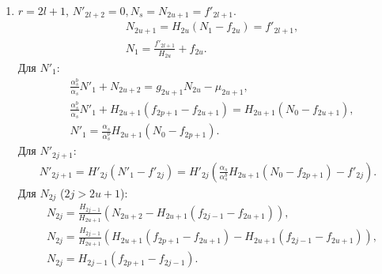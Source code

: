 \begin{enumerate}
\begin{enumerate}
\begin{enumerate}
            \item \( r=2l+1 \), \( N'_{2l+2} = 0, N_s = N_{2u+1} = f'_{2l+1} \).
            \begin{equation*}
                \begin{split}
                    & N_{2u+1} = H_{2u} (N_1 - f_{2u}) = f'_{2l+1}, \\
                    & N_1 = \frac{f'_{2l+1}}{H_{2u}} + f_{2u}.
                \end{split}
            \end{equation*}
            Для \(N'_{1}\):
            \begin{equation*}
                \begin{split}
                    & \frac{\alpha^b_s}{\alpha_s} N'_1 + N_{2u+2} = g_{2u+1} N_{2u} - \mu_{2u+1}, \\
                    & \frac{\alpha^b_s}{\alpha_s} N'_1 + H_{2u+1} (f_{2p+1} - f_{2u+1}) = H_{2u+1} (N_0 - f_{2u+1}), \\
                    & N'_1 = \frac{\alpha_s}{\alpha^b_s} H_{2u+1} (N_0 - f_{2p+1}).
                \end{split}
            \end{equation*}
            Для \(N'_{2j+1}\):
            \begin{equation*}
                \begin{split}
                    N'_{2j+1} = H'_{2j} (N'_1 - f'_{2j}) = H'_{2j} \left( \frac{\alpha_s}{\alpha^b_s} H_{2u+1} (N_0 - f_{2p+1}) - f'_{2j} \right).
                \end{split}
            \end{equation*}
            Для \(N_{2j}\) (\(2j > 2u+1\)):
            \begin{equation*}
                \begin{split}
                    & N_{2j} = \frac{H_{2j-1}}{H_{2u+1}} \left( N_{2u+2} - H_{2u+1} (f_{2j-1} - f_{2u+1}) \right), \\
                    & N_{2j} = \frac{H_{2j-1}}{H_{2u+1}} \left( H_{2u+1} (f_{2p+1} - f_{2u+1}) - H_{2u+1} (f_{2j-1} - f_{2u+1}) \right), \\
                    & N_{2j} = H_{2j-1} ( f_{2p+1} - f_{2j-1} ).
                \end{split}
            \end{equation*}
        \end{enumerate} %
    \end{enumerate} %
\end{enumerate} %

